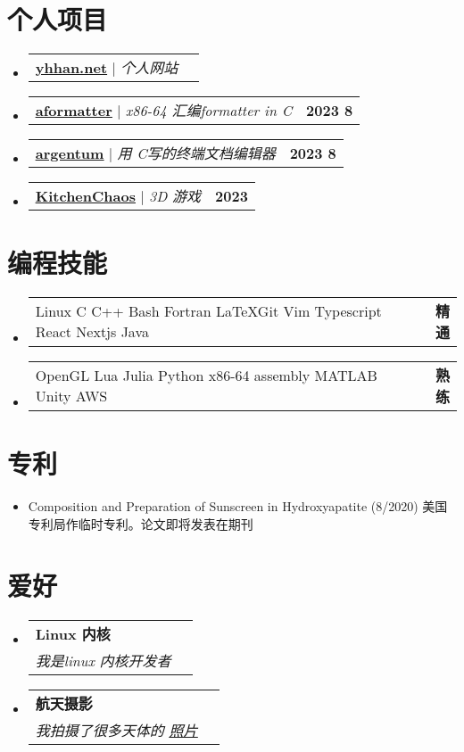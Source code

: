 \documentclass[letterpaper,11pt]{ctexart}
\makeatletter
\newcommand{\resumeItem}[1]{
  \item\small{
    {#1 \vspace{-2pt}}
  }
}
\newcommand{\resumeSubheading}[4]{
  \vspace{-2pt}\item
    \begin{tabular*}{1.0\textwidth}[t]{l@{\extracolsep{\fill}}r}
      \textbf{#1} & \textbf{\small #2} \\
      \textit{\small#3} & \textit{\small #4} \\
    \end{tabular*}\vspace{-7pt}
}
\newcommand{\resumeProjectHeading}[2]{
    \item
    \begin{tabular*}{1.001\textwidth}{l@{\extracolsep{\fill}}r}
      \small#1 & \textbf{\small #2}\\
    \end{tabular*}\vspace{-7pt}
}
\newcommand{\resumeSubHeadingListStart}{\begin{itemize}[leftmargin=0.0in, label={}]}
\newcommand{\resumeSubHeadingListEnd}{\end{itemize}}
\newcommand{\resumeItemListStart}{\begin{itemize}}
\newcommand{\resumeItemListEnd}{\end{itemize}\vspace{-5pt}}
\makeatother
\begin{document}
\section{个人项目}
    \vspace{-5pt}
    \resumeSubHeadingListStart
    \resumeProjectHeading 
    {
		\href{https://yhhan.net}{\underline{\textbf{yhhan.net}}}
    $|$ \emph{个人网站} 
	
    }{}
    \vspace{-27pt}
    \resumeProjectHeading 
    {
    \href{https://github.com/harryhanYuhao/aformatter.git}{\underline{\textbf{aformatter}}} 
    $|$ \emph{x86-64 汇编formatter in C} 
    }{2023 8}

    \vspace{-27pt}
    \resumeProjectHeading 
    {
    \href{https://github.com/harryhanYuhao/argentum.git}{\underline{\textbf{argentum}}} 
    $|$ \emph{用 C写的终端文档编辑器} 
    } {2023 8}

    \vspace{-27pt}
    \resumeProjectHeading 
    {
    \href{https://github.com/harryhanYuhao/kitchenChaos.git}{\underline{\textbf{KitchenChaos}}} 
    $|$ \emph{3D 游戏}
    }{ 2023}

   \resumeSubHeadingListEnd

\section{编程技能}
    \vspace{-5pt}
    \resumeSubHeadingListStart
    \resumeProjectHeading 
    { 
		Linux \textbullet{} C \textbullet{} C++ \textbullet{} Bash \textbullet{} Fortran \textbullet{} \LaTeX \textbullet Git \textbullet Vim \textbullet Typescript \textbullet React \textbullet Nextjs \textbullet Java
	}{精通}
    \vspace{-27pt}
    \resumeProjectHeading 
    { 
		OpenGL \textbullet Lua \textbullet{} Julia \textbullet Python \textbullet{} x86-64 assembly \textbullet{} MATLAB \textbullet{} Unity \textbullet AWS
	}{熟练}

   \resumeSubHeadingListEnd
%
\section{专利}
\resumeItemListStart
\resumeItem{Composition and Preparation of Sunscreen in Hydroxyapatite (8/2020) 美国专利局作临时专利。论文即将发表在期刊}
\resumeItemListEnd


\section{爱好}
    \resumeSubHeadingListStart
    \resumeSubheading{Linux 内核}{}{我是linux 内核开发者}{}
    \resumeSubheading{航天摄影}{}{我拍摄了很多天体的 \href{https://telescopius.com/profile/yuhao_han}{\underline{照片}}}{}
    \resumeSubHeadingListEnd
\end{document}
